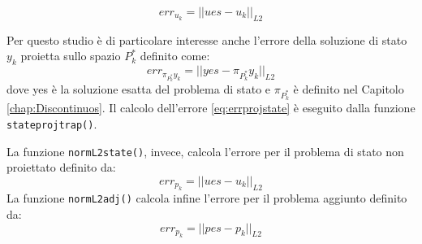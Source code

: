 \begin{equation}
err_{u_k} = || ues - u_k ||_{L2}
\label{eq:errcon}
\end{equation}
\par
Per questo studio è di particolare interesse anche l'errore della soluzione di stato $y_k$ proietta sullo spazio $P^*_k$ definito come:
\begin{equation}
err_{\pi_{P^*_k}y_k} = || yes - \pi_{P^*_k}y_k ||_{L2}
\label{eq:errprojstate}
\end{equation}
dove yes è la soluzione esatta del problema di stato e $\pi_{P^*_k}$ è definito nel Capitolo \ref{chap:Discontinuos}.
Il calcolo dell'errore \eqref{eq:errprojstate} è eseguito dalla funzione \texttt{stateprojtrap()}.
\par
La funzione \texttt{normL2state()}, invece, calcola l'errore per il problema di stato non proiettato definito da:
\begin{equation}
err_{p_k} = || ues - u_k ||_{L2}
\label{eq:errstate}
\end{equation}
La funzione \texttt{normL2adj()} calcola infine l'errore per il problema aggiunto definito da:
\begin{equation}
err_{p_k} = || pes - p_k ||_{L2}
\label{eq:erradj}
\end{equation}


